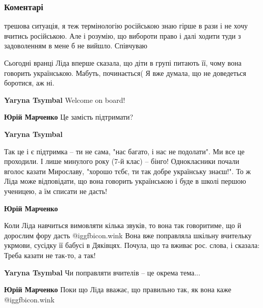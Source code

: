  
 
 
 
 
\subsubsection{Коментарі}

\begin{itemize} %

трешова ситуація, я теж термінологію російською знаю гірше в рази і не хочу
вчитись російською. Але і розумію, що вибороти право і далі ходити туди з
задоволенням в мене б не вийшло. Співчуваю


Сьогодні вранці Ліда вперше сказала, що діти в групі питають її, чому вона
говорить українською. Мабуть, починається( Я вже думала, що не доведеться
боротися, аж ні.

\begin{itemize} %
\textbf{Yaryna Tsymbal} Welcome on board!

\textbf{Юрій Марченко} Це замість підтримати?

\textbf{Yaryna Tsymbal} 

Так це і є підтримка – ти не сама, "нас багато, і нас не подолати". Ми все це
проходили. І лише минулого року (7-й клас) – бінго! Однокласники почали вголос
казати Мирославу, "хорошо тєбє, ти так добре українську знаєш!". То ж Ліда може
відповідати, що вона говорить українською і буде в школі першою ученицею, а їм
списати не дасть!

\textbf{Юрій Марченко} 

Коли Ліда навчиться вимовляти кілька звуків, то вона так говоритиме, що й
дорослим фору дасть  @igg{fbicon.wink}  Вона вже поправляла шкільну вчительку укрмови, сусідку
її бабусі в Дяківцях. Почула, що та вживає рос. слова, і сказала: Треба казати
не так-то, а так!

\textbf{Yaryna Tsymbal} Чи поправляти вчителів – це окрема тема...

\textbf{Юрій Марченко} Поки що Ліда вважає, що правильно так, як вона каже  @igg{fbicon.wink} 


\end{itemize}
\end{itemize}
